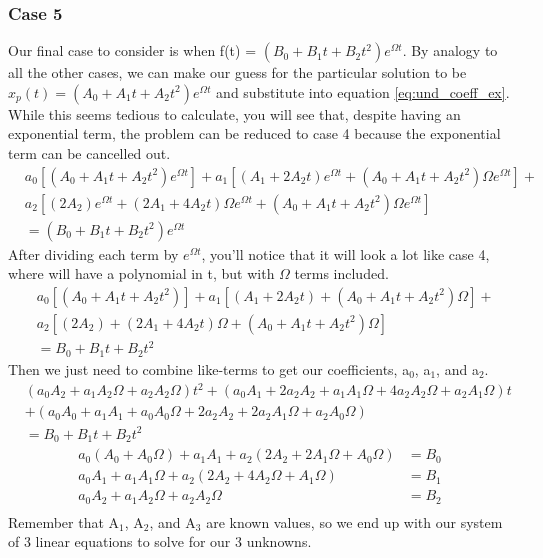 \documentclass{article}
\newcommand{\be}{\begin{equation}}
\newcommand{\ee}{\end{equation}}
\begin{document}
\subsubsection*{Case 5}
Our final case to consider is when f(t) = $(B_0 + B_1t + B_2t^2) e^{\Omega t}$.
By analogy to all the other cases, we can make our guess for the particular solution to be $x_p(t) = (A_0 + A_1 t + A_2 t^2) e^{\Omega t}$ and substitute into equation \ref{eq:und_coeff_ex}.
While this seems tedious to calculate, you will see that, despite having an exponential term, the problem can be reduced to case 4 because the exponential term can be cancelled out.
\be
\begin{split}
& a_0[ (A_0 + A_1 t + A_2 t^2) e^{\Omega t} ] + a_1[ (A_1 + 2 A_2 t) e^{\Omega t} + (A_0 + A_1 t + A_2 t^2) \Omega e^{\Omega t} ] + \\
& a_2[ (2 A_2) e^{\Omega t} + (2 A_1 + 4 A_2 t) \Omega e^{\Omega t} + (A_0 + A_1 t + A_2 t^2) \Omega e^{\Omega t}] \\
&= (B_0 + B_1t + B_2t^2) e^{\Omega t}
\end{split}
\ee
After dividing each term by $e^{\Omega t}$, you'll notice that it will look a lot like case 4, where will have a polynomial in t, but with $\Omega$ terms included.
\be
\begin{split}
& a_0[ (A_0 + A_1 t + A_2 t^2) ] + a_1[ (A_1 + 2 A_2 t) + (A_0 + A_1 t + A_2 t^2) \Omega ] + \\
& a_2[ (2 A_2) + (2 A_1 + 4 A_2 t) \Omega + (A_0 + A_1 t + A_2 t^2) \Omega] \\
&= B_0 + B_1t + B_2t^2
\end{split}
\ee
Then we just need to combine like-terms to get our coefficients, a$_0$, a$_1$, and a$_2$.
\be
\begin{split}
&(a_0 A_2 + a_1 A_2 \Omega + a_2 A_2 \Omega) t^2 + (a_0 A_1 + 2a_2 A_2 + a_1 A_1 \Omega + 4a_2 A_2 \Omega + a_2 A_1 \Omega) t \\
& + (a_0 A_0 + a_1 A_1 + a_0 A_0 \Omega + 2a_2 A_2 + 2a_2 A_1 \Omega + a_2 A_0 \Omega) \\
&= B_0 + B_1t + B_2t^2
\end{split}
\ee
\be
\begin{split}
    a_0(A_0 + A_0 \Omega) + a_1 A_1 + a_2(2 A_2 + 2 A_1 \Omega + A_0 \Omega) &= B_0 \\
    a_0 A_1 + a_1 A_1 \Omega + a_2(2 A_2 + 4 A_2 \Omega + A_1 \Omega) &= B_1 \\
    a_0 A_2 + a_1 A_2 \Omega + a_2 A_2 \Omega &= B_2 \\
\end{split}
\ee
Remember that A$_1$, A$_2$, and A$_3$ are known values, so we end up with our system of 3 linear equations to solve for our 3 unknowns.
\end{document}
